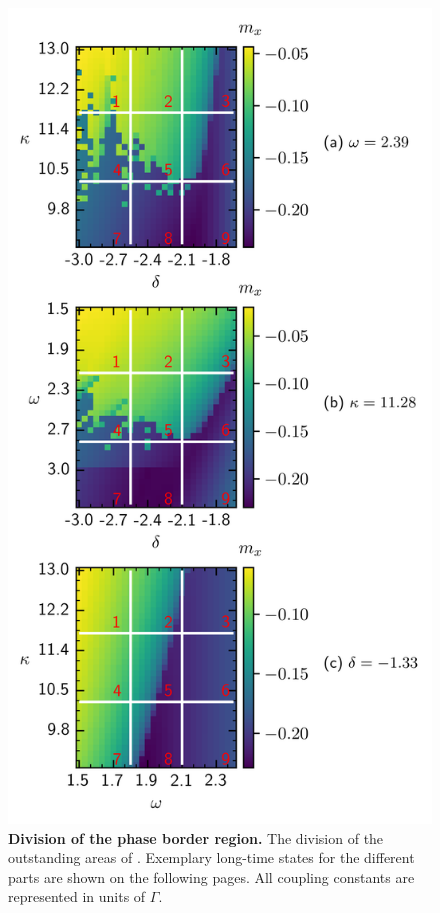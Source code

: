     \begin{figure}[H]
        \vspace*{-0.3cm}
        \centering
        \includegraphics[scale=0.98]{pictures/combined_spec_sec.png}
        \caption{\textbf{Division of the phase border region.} The division of the outstanding areas of . Exemplary long-time states for the different parts are shown on the following pages. All coupling constants are represented in units of $\Gamma$.}
    \end{figure}
    
